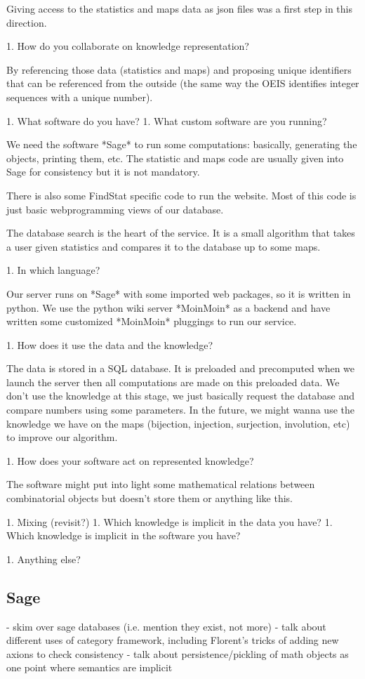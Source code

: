 \documentclass{deliverablereport}
\begin{document}
Giving access to the statistics and maps data as json files was a first step in this direction.

 1. How do you collaborate on knowledge representation?

By referencing those data (statistics and maps) and proposing unique identifiers that can be referenced from the outside (the same way the OEIS
identifies integer sequences with a unique number).

1. What software do you have?
 1. What custom software are you running?

We need the software *Sage* to run some computations: basically, generating the objects, printing them, etc. The statistic and maps code are usually given into
Sage for consistency but it is not mandatory.

There is also some FindStat specific code to run the website. Most of this code is just basic webprogramming views of our database.

The database search is the heart of the service. It is a small algorithm that takes a user given statistics and compares it to the database up to some maps.

 1. In which language?

Our server runs on *Sage* with some imported web packages, so it is written in python. We use the python wiki server *MoinMoin* as a backend
and have written some customized *MoinMoin* pluggings to run our service.

 1. How does it use the data and the knowledge?

The data is stored in a SQL database. It is preloaded and precomputed when we launch the server then all computations are made on this preloaded data.
We don't use the knowledge at this stage, we just basically request the database and compare numbers using some parameters. In the future, we might wanna
use the knowledge we have on the maps (bijection, injection, surjection, involution, etc) to improve our algorithm.

 1. How does your software act on represented knowledge?

The software might put into light some mathematical relations between combinatorial objects but doesn't store them or anything like this.

1. Mixing (revisit?)
 1. Which knowledge is implicit in the data you have?
 1. Which knowledge is implicit in the software you have?

1. Anything else?

\subsection{Sage}
  - skim over sage databases (i.e. mention they exist, not more)
  - talk about different uses of category framework, including Florent's tricks of adding new axions to check consistency
  - talk about persistence/pickling of math objects as one point where semantics are implicit
\end{document}
